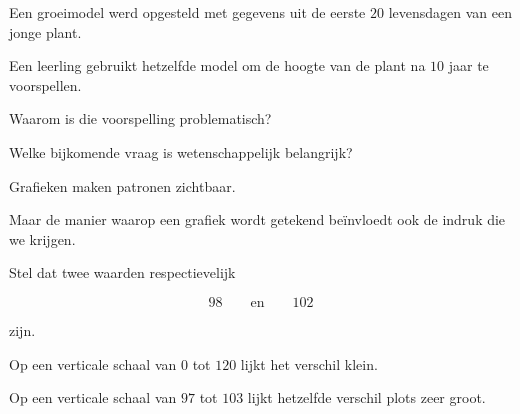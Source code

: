 \documentclass{ximera}
\begin{document}
\begin{oefening}{\oefU \ESS}

Een groeimodel werd opgesteld met gegevens uit de eerste
$20$ levensdagen van een jonge plant.

Een leerling gebruikt hetzelfde model om de hoogte van de plant
na $10$ jaar te voorspellen.

\begin{question}
Waarom is die voorspelling problematisch?

\begin{multipleChoice}
\end{multipleChoice}
\end{question}

\begin{question}
Welke bijkomende vraag is wetenschappelijk belangrijk?

\begin{multipleChoice}
\end{multipleChoice}
\end{question}

\end{oefening}




Grafieken maken patronen zichtbaar.

Maar de manier waarop een grafiek wordt getekend beïnvloedt ook de
indruk die we krijgen.

Stel dat twee waarden respectievelijk

\[
98
\qquad\text{en}\qquad
102
\]

zijn.

Op een verticale schaal van $0$ tot $120$ lijkt het verschil klein.

Op een verticale schaal van $97$ tot $103$ lijkt hetzelfde verschil
plots zeer groot.
\end{document}
